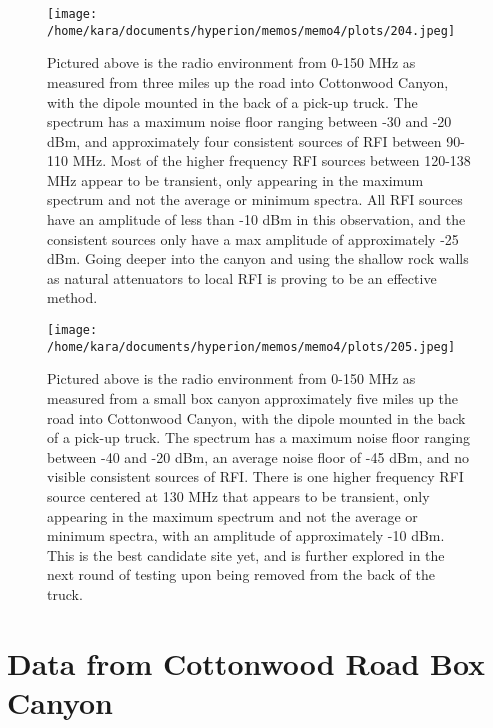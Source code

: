 \documentclass[11pt]{article}
\begin{document}
\begin{figure}[H]
    \begin{center}
    \texttt{[image: /home/kara/documents/hyperion/memos/memo4/plots/204.jpeg]}
    \end{center}
    \caption{
        Pictured above is the radio environment from 0-150 MHz as measured from 
        three miles up the road into Cottonwood Canyon, with the dipole mounted 
        in the back of a pick-up truck.  The spectrum has a maximum noise floor 
        ranging between -30 and -20 dBm, and approximately four consistent 
        sources of RFI between 90-110 MHz. Most of the higher frequency RFI 
        sources between 120-138 MHz appear to be transient, only appearing in 
        the maximum spectrum and not the average or minimum spectra. All RFI 
        sources have an amplitude of less than -10 dBm in this observation, and 
        the consistent sources only have a max amplitude of approximately -25 
        dBm. Going deeper into the canyon and using the shallow rock walls as 
        natural attenuators to local RFI is proving to be an effective method.
    }
    \label{fig:204}
\end{figure}
\begin{figure}[H]
    \begin{center}
    \texttt{[image: /home/kara/documents/hyperion/memos/memo4/plots/205.jpeg]}
    \end{center}
    \caption{
        Pictured above is the radio environment from 0-150 MHz as measured from 
        a small box canyon approximately five miles up the road into Cottonwood 
        Canyon, with the dipole mounted in the back of a pick-up truck.  The 
        spectrum has a maximum noise floor ranging between -40 and -20 dBm, an 
        average noise floor of -45 dBm, and no visible consistent sources of 
        RFI.  There is one higher frequency RFI source centered at 130 MHz that 
        appears to be transient, only appearing in the maximum spectrum and not 
        the average or minimum spectra, with an amplitude of approximately -10 
        dBm.  This is the best candidate site yet, and is further explored in 
        the next round of testing upon being removed from the back of the 
        truck.
    }
    \label{fig:205}
\end{figure}

\section{Data from Cottonwood Road Box Canyon}
\end{document}
